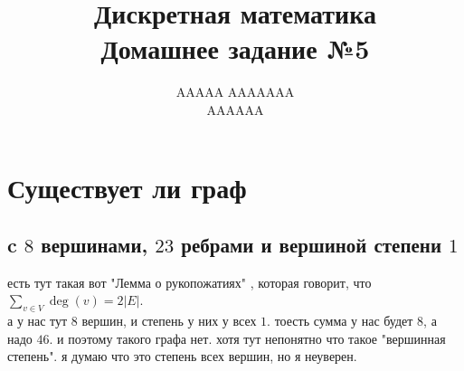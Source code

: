 \documentclass{article}
\title{Дискретная математика \\ Домашнее задание №5}
\author{AAAAA AAAAAAA \\ AAAAAA}
\newcommand{\ds}{\displaystyle}
\begin{document}
  \maketitle

  \section{Существует ли граф}
  \subsection{c $8$ вершинами, $23$ ребрами и вершиной степени $1$}
  есть тут такая вот "{}Лемма о рукопожатиях"{} \cite{lem}, которая говорит, что $\ds \sum_{v\in V}\deg(v)=2|E|$. \\
  а у нас тут $8$ вершин, и степень у них у всех $1$.
  тоесть сумма у нас будет $8$, а надо $46$.
  и поэтому такого графа нет.
  хотя тут непонятно что такое "{}вершинная степень"{}.
  я думаю что это степень всех вершин, но я неуверен.
\end{document}
